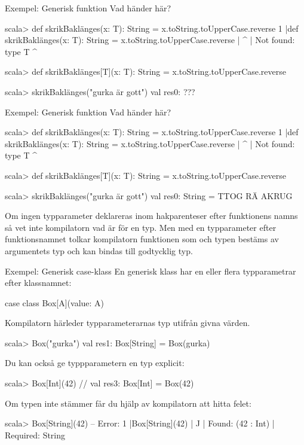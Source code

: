 \begin{Slide}{Exempel: Generisk funktion}
Vad händer här?
\begin{REPL}

scala> def skrikBaklänges(x: T): String = x.toString.toUpperCase.reverse
1 |def skrikBaklänges(x: T): String = x.toString.toUpperCase.reverse
  |                      ^
  |                      Not found: type T
                             ^

scala> def skrikBaklänges[T](x: T): String = x.toString.toUpperCase.reverse

scala> skrikBaklänges("gurka är gott")
val res0: ???
\end{REPL}
\end{Slide}
\fi

\begin{Slide}{Exempel: Generisk funktion}
Vad händer här?
\begin{REPL}

scala> def skrikBaklänges(x: T): String = x.toString.toUpperCase.reverse
1 |def skrikBaklänges(x: T): String = x.toString.toUpperCase.reverse
  |                      ^
  |                      Not found: type T
                             ^

scala> def skrikBaklänges[T](x: T): String = x.toString.toUpperCase.reverse

scala> skrikBaklänges("gurka är gott")
val res0: String = TTOG RÄ AKRUG
\end{REPL}
Om ingen typparameter deklareras inom hakparenteser efter funktionens namns så vet inte kompilatorn vad  är för en typ. Men med en typparameter \code{[T]} efter funktionsnamnet tolkar kompilatorn funktionen som  och typen  bestäms av argumentets typ  och  kan bindas till godtycklig typ.
\end{Slide}


\begin{Slide}{Exempel: Generisk case-klass}
\SlideFontSmall
En generisk klass har en eller flera typparametrar efter klassnamnet:
\begin{Code}
case class Box[A](value: A)  
\end{Code}

Kompilatorn härleder typparameterarnas typ utifrån givna värden. 
\begin{REPL}
scala> Box("gurka")  
val res1: Box[String] = Box(gurka)
\end{REPL}

Du kan också ge typpparametern en typ explicit:
\begin{REPL}
scala> Box[Int](42)  // 
val res3: Box[Int] = Box(42)
\end{REPL}

Om typen inte stämmer får du hjälp av kompilatorn att hitta felet:
\begin{REPL}
scala> Box[String](42)
-- Error:
1 |Box[String](42)
  |            ^^
  |            Found:    (42 : Int)
  |            Required: String
\end{REPL}
\end{Slide}



